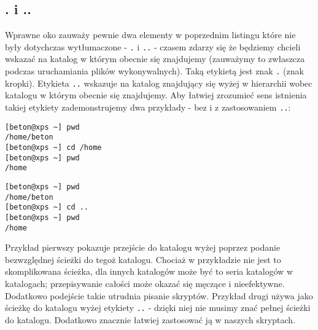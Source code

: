 \subsection{. i ..}
Wprawne oko zauważy pewnie dwa elementy w poprzednim listingu które nie były dotychczas wytłumaczone - \texttt{.} i \texttt{..} - czasem zdarzy się że będziemy chcieli wskazać na katalog w którym obecnie się znajdujemy (zauważymy to zwłaszcza podczas uruchamiania plików wykonywalnych). Taką etykietą jest znak \texttt{.} (znak kropki).
\newline
\newline
Etykieta \texttt{..} wskazuje na katalog znajdujący się wyżej w hierarchii wobec katalogu w którym obecnie się znajdujemy. Aby łatwiej zrozumieć sens istnienia takiej etykiety zademonstrujemy dwa przykłady - bez i z zastosowaniem \texttt{..}:
\newline
\begin{verbatim}
[beton@xps ~] pwd
/home/beton
[beton@xps ~] cd /home
[beton@xps ~] pwd
/home
\end{verbatim}
\begin{verbatim}
[beton@xps ~] pwd
/home/beton
[beton@xps ~] cd ..
[beton@xps ~] pwd
/home
\end{verbatim}
Przykład pierwszy pokazuje przejście do katalogu wyżej poprzez podanie bezwzględnej ścieżki do tegoż katalogu. Chociaż w przykładzie nie jest to skomplikowana ścieżka, dla innych katalogów może być to seria katalogów w katalogach; przepisywanie całości może okazać się męczące i nieefektywne. Dodatkowo podejście takie utrudnia pisanie skryptów.
\newline
\newline
Przykład drugi używa jako ścieżkę do katalogu wyżej etykiety \texttt{..} - dzięki niej nie musimy znać pełnej ścieżki do katalogu. Dodatkowo znacznie łatwiej zastosować ją w naszych skryptach.

